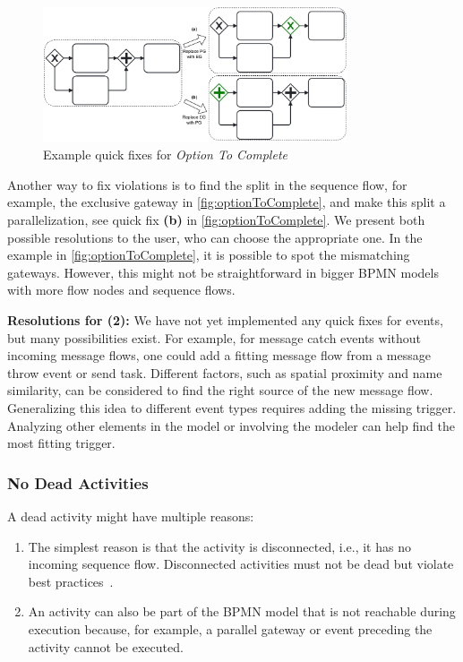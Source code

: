 \documentclass[runningheads]{llncs}
\begin{document}
\begin{figure}[ht]
	\centering
	\includegraphics[width=0.8\textwidth]{images/optionToComplete}
	\caption{Example quick fixes for \textit{Option To Complete}}
	\label{fig:optionToComplete}
\end{figure}

Another way to fix violations is to find the split in the sequence flow, for example, the exclusive gateway in \autoref{fig:optionToComplete}, and make this split a parallelization, see quick fix \textbf{(b)} in \autoref{fig:optionToComplete}.
We present both possible resolutions to the user, who can choose the appropriate one.
In the example in \autoref{fig:optionToComplete}, it is possible to spot the mismatching gateways.
However, this might not be straightforward in bigger BPMN models with more flow nodes and sequence flows.

\textbf{Resolutions for (2):} We have not yet implemented any quick fixes for events, but many possibilities exist.
For example, for message catch events without incoming message flows, one could add a fitting message flow from a message throw event or send task.
Different factors, such as spatial proximity and name similarity, can be considered to find the right source of the new message flow.
Generalizing this idea to different event types requires adding the missing trigger.
Analyzing other elements in the model or involving the modeler can help find the most fitting trigger.

\subsubsection{No Dead Activities}
A dead activity might have multiple reasons:

\begin{enumerate}
	\item The simplest reason is that the activity is disconnected, i.e., it has no incoming sequence flow.
	Disconnected activities must not be dead but violate best practices~\cite{camundaservicesgmbhBpmnlint2024}.
	\item An activity can also be part of the BPMN model that is not reachable during execution because, for example, a parallel gateway or event preceding the activity cannot be executed.
\end{enumerate}
\end{document}
